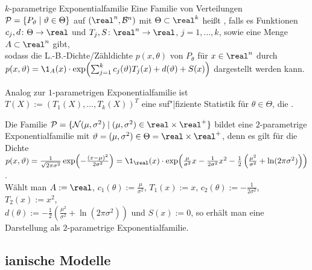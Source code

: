 \linie
\pagebreak

\begin{Def}{$k$-parametrige Exponentialfamilie}
    Eine Familie von Verteilungen $\P = \{P_\theta \;|\; \theta \in \Theta\}$ auf
    $(\real^n, \B^n)$ mit $\Theta \subset \real^k$ heißt
    , falls
    es Funktionen\\
    $c_j, d\colon \Theta \rightarrow \real$ und
    $T_j, S\colon \real^n \rightarrow \real$, $j = 1, \dotsc, k$,
    sowie eine Menge $A \subset \real^n$ gibt,\\
    sodass die L.-B.-Dichte/Zähldichte $p(x, \theta)$ von $P_\theta$ für $x \in \real^n$
    durch\\
    $p(x, \theta) = \1_A(x) \cdot
    \exp\!\left(\sum_{j=1}^k c_j(\theta) T_j(x) + d(\theta) + S(x)\right)$
    dargestellt werden kann.
\end{Def}

\begin{Bem}
    Analog zur $1$-parametrigen Exponentialfamilie ist $T(X) := (T_1(X), \dotsc, T_k(X))^T$
    eine suf"|fiziente Statistik für $\theta \in \Theta$,
    die .
\end{Bem}

\begin{Bsp}
    Die Familie $\P = \{\N(\mu, \sigma^2) \;|\; (\mu, \sigma^2) \in \real \times \real^+\}$ bildet
    eine $2$-parametrige Exponentialfamilie mit
    $\theta = (\mu, \sigma^2) \in \Theta = \real \times \real^+$, denn es gilt für die Dichte\\
    $p(x, \theta) = \frac{1}{\sqrt{2\pi\sigma^2}}
    \exp\!\left(-\frac{(x - \mu)^2}{2\sigma^2}\right) =
    \1_\real(x) \cdot \exp\!\left(\frac{\mu}{\sigma^2}x - \frac{1}{2\sigma^2} x^2 -
    \frac{1}{2} \left(\frac{\mu^2}{\sigma^2} + \ln(2\pi\sigma^2)\right)\right)$.\\
    Wählt man $A := \real$, $c_1(\theta) := \frac{\mu}{\sigma^2}$, $T_1(x) := x$,
    $c_2(\theta) := -\frac{1}{2\sigma^2}$, $T_2(x) := x^2$,\\
    $d(\theta) := -\frac{1}{2} \left(\frac{\mu^2}{\sigma^2} + \ln(2\pi\sigma^2)\right)$
    und $S(x) := 0$, so erhält man eine Darstellung als $2$-parametrige Exponentialfamilie.
\end{Bsp}

\subsection{%
    ianische Modelle%
}


